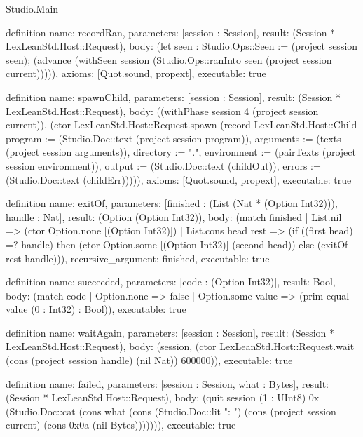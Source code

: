 \begin{lexlean}{Studio.Main}
\begin{semanticmodule}
definition{
  name: recordRan,
  parameters: [session : Session],
  result: (Session * LexLeanStd.Host::Request),
  body: (let seen : Studio.Ops::Seen := (project session seen); (advance (withSeen session (Studio.Ops::ranInto seen (project session current))))),
  axioms: [Quot.sound, propext],
  executable: true
}

definition{
  name: spawnChild,
  parameters: [session : Session],
  result: (Session * LexLeanStd.Host::Request),
  body: ((withPhase session 4 (project session current)), (ctor LexLeanStd.Host::Request.spawn (record LexLeanStd.Host::Child {program := (Studio.Doc::text (project session program)), arguments := (texts (project session arguments)), directory := ".", environment := (pairTexts (project session environment)), output := (Studio.Doc::text (childOut)), errors := (Studio.Doc::text (childErr))}))),
  axioms: [Quot.sound, propext],
  executable: true
}

definition{
  name: exitOf,
  parameters: [finished : (List (Nat * (Option Int32))), handle : Nat],
  result: (Option (Option Int32)),
  body: (match finished
    | List.nil => (ctor Option.none [(Option Int32)])
    | List.cons head rest => (if ((first head) =? handle) then (ctor Option.some [(Option Int32)] (second head)) else (exitOf rest handle))),
  recursive_argument: finished,
  executable: true
}

definition{
  name: succeeded,
  parameters: [code : (Option Int32)],
  result: Bool,
  body: (match code
    | Option.none => false
    | Option.some value => (prim equal value (0 : Int32) : Bool)),
  executable: true
}

definition{
  name: waitAgain,
  parameters: [session : Session],
  result: (Session * LexLeanStd.Host::Request),
  body: (session, (ctor LexLeanStd.Host::Request.wait (cons (project session handle) (nil Nat)) 600000)),
  executable: true
}

definition{
  name: failed,
  parameters: [session : Session, what : Bytes],
  result: (Session * LexLeanStd.Host::Request),
  body: (quit session (1 : UInt8) 0x (Studio.Doc::cat (cons what (cons (Studio.Doc::lit ": ") (cons (project session current) (cons 0x0a (nil Bytes))))))),
  executable: true
}


\end{semanticmodule}
\end{lexlean}
